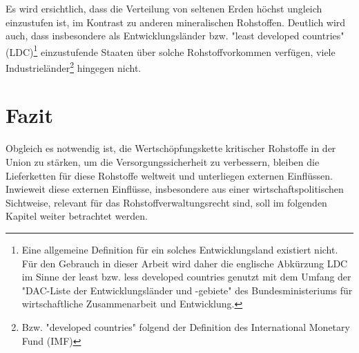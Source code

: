 \documentclass[12pt,a4paper,oneside]{book} %
\begin{document}
	
	Es wird ersichtlich, dass die Verteilung von seltenen Erden höchst ungleich einzustufen ist, im Kontrast zu anderen mineralischen Rohstoffen. Deutlich wird auch, dass insbesondere als Entwicklungsländer bzw. "least developed countries" (LDC)\footnote{Eine allgemeine Definition für ein solches Entwicklungsland existiert nicht. Für den Gebrauch in dieser Arbeit wird daher die englische Abkürzung LDC im Sinne der least bzw. less developed countries genutzt mit dem Umfang der "DAC-Liste der Entwicklungsländer und -gebiete" des Bundesministeriums für wirtschaftliche Zusammenarbeit und Entwicklung.} einzustufende Staaten über solche Rohstoffvorkommen verfügen, viele Industrieländer\footnote{Bzw. "developed countries"  folgend der Definition des International Monetary Fund (IMF)} hingegen nicht. 
	
	\section{Fazit}
	Obgleich es notwendig ist, die Wertschöpfungskette kritischer Rohstoffe in der Union zu stärken, um die Versorgungssicherheit zu verbessern, bleiben die Lieferketten für diese Rohstoffe weltweit und unterliegen externen Einflüssen. Inwieweit diese externen Einflüsse, insbesondere aus einer wirtschaftspolitischen Sichtweise, relevant für das Rohstoffverwaltungsrecht sind, soll im folgenden Kapitel weiter betrachtet werden.
	
\end{document}

